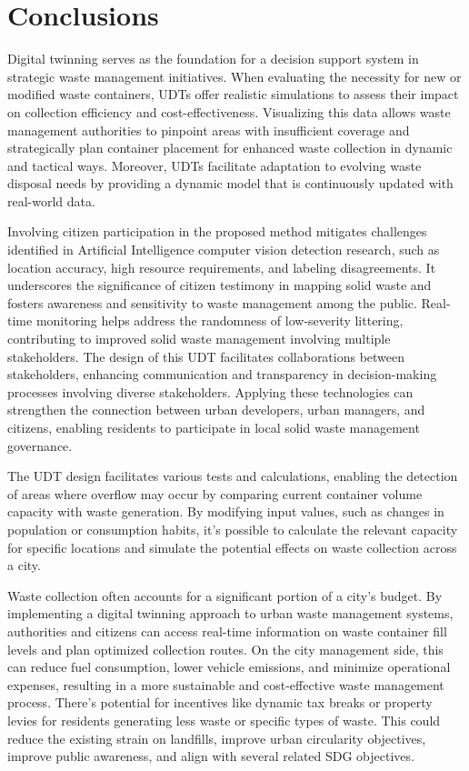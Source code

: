 \documentclass[authoryear,preprint,review,doubleblind, 12pt]{elsarticle}
\begin{document}
    \section{Conclusions} \label{sec:conclusions}

    Digital twinning serves as the foundation for a decision support system in strategic waste management initiatives. When evaluating the necessity for new or modified waste containers, UDTs offer realistic simulations to assess their impact on collection efficiency and cost-effectiveness. Visualizing this data allows waste management authorities to pinpoint areas with insufficient coverage and strategically plan container placement for enhanced waste collection in dynamic and tactical ways. Moreover, UDTs facilitate adaptation to evolving waste disposal needs by providing a dynamic model that is continuously updated with real-world data.
    
    Involving citizen participation in the proposed method mitigates challenges identified in Artificial Intelligence computer vision detection research, such as location accuracy, high resource requirements, and labeling disagreements. It underscores the significance of citizen testimony in mapping solid waste and fosters awareness and sensitivity to waste management among the public. Real-time monitoring helps address the randomness of low-severity littering, contributing to improved solid waste management involving multiple stakeholders. The design of this UDT facilitates collaborations between stakeholders, enhancing communication and transparency in decision-making processes involving diverse stakeholders. Applying these technologies can strengthen the connection between urban developers, urban managers, and citizens, enabling residents to participate in local solid waste management governance.
    
    The UDT design facilitates various tests and calculations, enabling the detection of areas where overflow may occur by comparing current container volume capacity with waste generation. By modifying input values, such as changes in population or consumption habits, it's possible to calculate the relevant capacity for specific locations and simulate the potential effects on waste collection across a city.

    Waste collection often accounts for a significant portion of a city's budget. By implementing a digital twinning approach to urban waste management systems, authorities and citizens can access real-time information on waste container fill levels and plan optimized collection routes. On the city management side, this can reduce fuel consumption, lower vehicle emissions, and minimize operational expenses, resulting in a more sustainable and cost-effective waste management process. There's potential for incentives like dynamic tax breaks or property levies for residents generating less waste or specific types of waste. This could reduce the existing strain on landfills, improve urban circularity objectives, improve public awareness, and align with several related SDG objectives.
\end{document}
